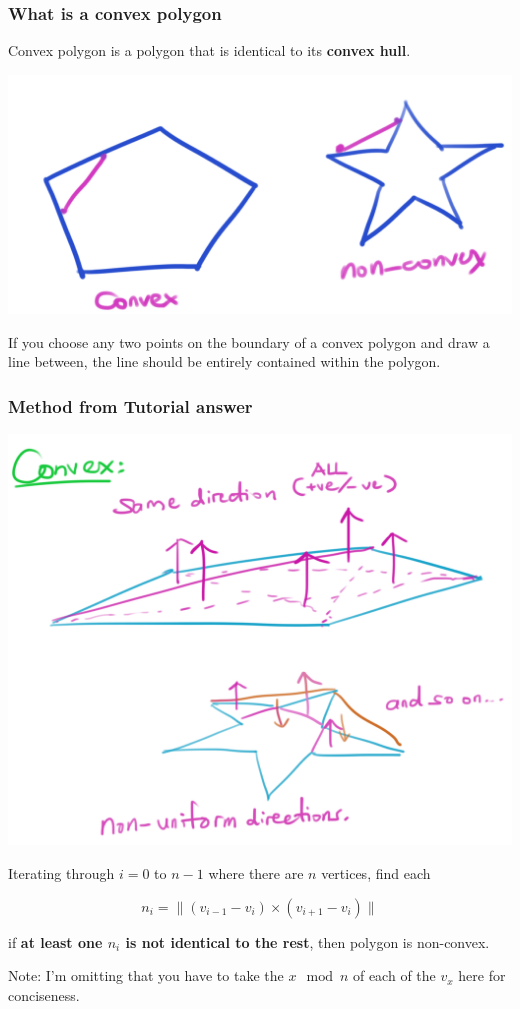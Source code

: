 \documentclass{beamer}
\begin{document}
\begin{frame}
    \frametitle{What is a convex polygon}

    Convex polygon is a polygon that is identical to its \textbf{convex hull}.\\

    \begin{center}
        \includegraphics[scale=0.3]{convex-def.png}
    \end{center}

    If you choose any two points on the boundary of a convex polygon and draw a line between, 
    the line should be entirely contained within the polygon.

\end{frame}

\begin{frame}
    \frametitle{Method from Tutorial answer}

    \begin{center}
        \includegraphics[scale=0.2]{convex.png}
    \end{center}

    Iterating through $i = 0$ to $n-1$ where there are $n$ vertices, find each

    $$
    n_i = \|(v_{i-1} - v_{i}) \times (v_{i+1} - v_{i})\|
    $$
    
    if \textbf{at least one $n_i$ is not identical to the rest}, then polygon is non-convex.

    {\tiny Note: I'm omitting that you have to take the $x\mod n$ of each of the $v_x$ here for conciseness. }
    
\end{frame}
\end{document}
